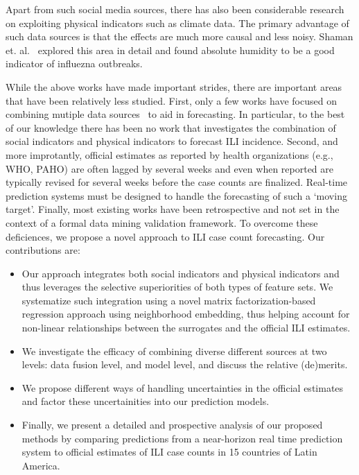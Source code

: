 Apart from such social media sources,
there has also been considerable research on 
exploiting physical indicators such as climate data.
The primary advantage of such data sources is that the
effects are much more causal and less noisy. 
Shaman et. al.~\cite{ref9, Shaman_orig_humidity_link, Shaman_humidity_USA} 
explored this area in detail and found absolute humidity 
to be a good indicator of influezna outbreaks.

While the above works have made important strides, there are important areas that
have been relatively less studied. First, 
only a few works have focused on combining mutiple data sources~\cite{ref10, ref3}
to aid in forecasting. In particular, to the best of our knowledge there has been no work
that investigates the combination of social indicators and physical indicators to forecast
ILI incidence. Second, and more improtantly, official estimates as reported by health
organizations (e.g., WHO, PAHO) are often lagged by several weeks and
even when reported are typically revised for several weeks before the case counts are
finalized. Real-time prediction systems must be designed to handle the forecasting of
such a `moving target'. Finally, most existing works have been retrospective and not set in
the context of a formal data mining validation framework. To overcome these deficiences, we
propose a novel approach to ILI case count forecasting. Our contributions are:
\begin{itemize}
  \item Our approach integrates both social indicators and physical indicators and thus
leverages the selective superiorities of both types of feature sets. We systematize such
integration using a novel matrix factorization-based regression approach
using neighborhood embedding, thus helping account for 
non-linear relationships between the surrogates and the official ILI estimates.
  \item We investigate the efficacy of combining diverse different sources at two
levels: data fusion level, and model level, and discuss the relative (de)merits.
  \item We propose different ways of handling uncertainties in the official 
    estimates and factor these uncertainities into our prediction models.
  \item Finally, we present a detailed and prospective analysis of our proposed methods
    by comparing predictions from a near-horizon real time prediction system to 
    official estimates of ILI case counts in 15 countries of Latin America.
\end{itemize}

